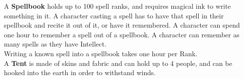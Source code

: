 A \textbf{Spellbook} holds up to 100 spell ranks, and requires magical ink to write something in it.
A character casting a spell has to have that spell in their spellbook and recite it out of it, or have it remembered.
A character can spend one hour to remember a spell out of a spellbook.
A character can remember as many spells as they have Intellect.\\
Writing a known spell into a spellbook takes one hour per Rank.\\

A \textbf{Tent} is made of skins and fabric and can hold up to 4 people, and can be hooked into the earth in order to withstand winds.\\
